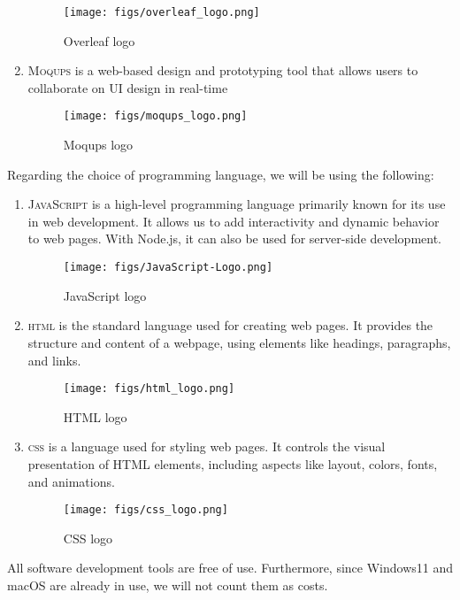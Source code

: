 \documentclass[conference]{IEEEtran}
\begin{document}
\begin{enumerate}
        \begin{figure}[H]
        \centering
        \texttt{[image: figs/overleaf\_logo.png]}
        \caption{Overleaf logo}
        \label{fig:overleaf logo}
        \end{figure}
    \item \textsc{Moqups} is a web-based design and prototyping tool that allows users to collaborate on UI design in real-time
        \begin{figure}[H]
        \centering
        \texttt{[image: figs/moqups\_logo.png]}
        \caption{Moqups logo}
        \label{fig:Moqups logo}
        \end{figure}
\end{enumerate}
Regarding the choice of programming language, we will be using the following:
\begin{enumerate}
    \item \textsc{JavaScript} is a high-level programming language primarily known for its use in web development. It allows us to add interactivity and dynamic behavior to web pages. With Node.js, it can also be used for server-side development.
        \begin{figure}[H]
        \centering
        \texttt{[image: figs/JavaScript-Logo.png]}
        \caption{JavaScript logo}
        \label{fig:JavaScript logo}
        \end{figure}
    \item \textsc{html} is the standard language used for creating web pages. It provides the structure and content of a webpage, using elements like headings, paragraphs, and links.
        \begin{figure}[H]
        \centering
        \texttt{[image: figs/html\_logo.png]}
        \caption{HTML logo}
        \label{fig:HTML logo}
        \end{figure}
    \item \textsc{css} is a language used for styling web pages. It controls the visual presentation of HTML elements, including aspects like layout, colors, fonts, and animations.
        \begin{figure}[H]
        \centering
        \texttt{[image: figs/css\_logo.png]}
        \caption{CSS logo}
        \label{fig:CSS logo}
        \end{figure}
\end{enumerate}
All software development tools are free of use. Furthermore, since Windows11 and macOS are already in use, we will not count them as costs.
\end{document}
